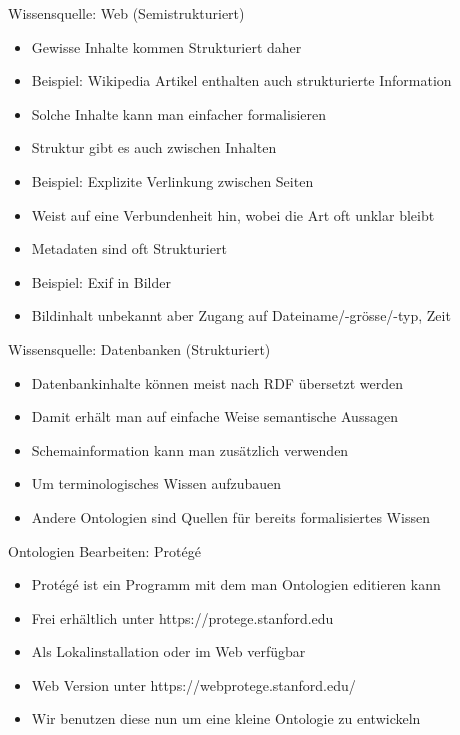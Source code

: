\documentclass{beamer}
\begin{document}
\begin{frame}{Wissensquelle: Web (Semistrukturiert)}
	
	\begin{itemize}
		\item Gewisse Inhalte kommen Strukturiert daher
		\item Beispiel: Wikipedia Artikel enthalten auch strukturierte Information
		\item Solche Inhalte kann man einfacher formalisieren
		\item Struktur gibt es auch zwischen Inhalten
		\item Beispiel: Explizite Verlinkung zwischen Seiten
		\item Weist auf eine Verbundenheit hin, wobei die Art oft unklar bleibt
		\item Metadaten sind oft Strukturiert
		\item Beispiel: Exif in Bilder
		\item Bildinhalt unbekannt aber Zugang auf Dateiname/-grösse/-typ, Zeit
	\end{itemize}
	
\end{frame}

\begin{frame}{Wissensquelle: Datenbanken (Strukturiert)}
	
	\begin{itemize}
		\item Datenbankinhalte können meist nach RDF übersetzt werden
		\item Damit erhält man auf einfache Weise semantische Aussagen
		\item Schemainformation kann man zusätzlich verwenden
		\item Um terminologisches Wissen aufzubauen
		\item Andere Ontologien sind Quellen für bereits formalisiertes Wissen
	\end{itemize}
	
\end{frame}

\begin{frame}{Ontologien Bearbeiten: Prot{\'e}g{\'e}}
	
	\begin{itemize}
		\item Prot{\'e}g{\'e} ist ein Programm mit dem man Ontologien editieren kann
		\item Frei erhältlich unter https://protege.stanford.edu
		\item Als Lokalinstallation oder im Web verfügbar
		\item Web Version unter https://webprotege.stanford.edu/
		\item Wir benutzen diese nun um eine kleine Ontologie zu entwickeln
	\end{itemize}
	
\end{frame}
\end{document}
